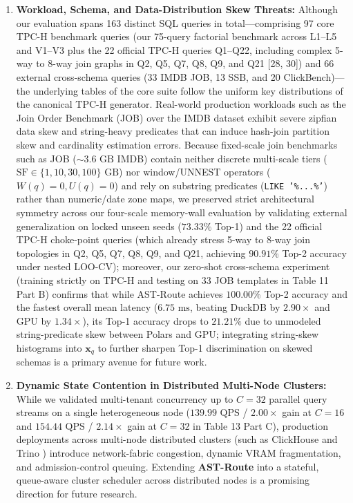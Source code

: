 \documentclass[10pt,a4paper]{article}
\begin{document}
\begin{enumerate}[leftmargin=1.5em,itemsep=2pt]
    \item \textbf{Workload, Schema, and Data-Distribution Skew Threats:} Although our evaluation spans 163 distinct SQL queries in total---comprising 97 core TPC-H benchmark queries (our 75-query factorial benchmark across L1--L5 and V1--V3 plus the 22 official TPC-H queries Q1--Q22, including complex 5-way to 8-way join graphs in Q2, Q5, Q7, Q8, Q9, and Q21 [28, 30]) and 66 external cross-schema queries (33 IMDB JOB, 13 SSB, and 20 ClickBench)---the underlying tables of the core suite follow the uniform key distributions of the canonical TPC-H generator. Real-world production workloads such as the Join Order Benchmark (JOB) \cite{leis2015job} over the IMDB dataset exhibit severe zipfian data skew and string-heavy predicates that can induce hash-join partition skew and cardinality estimation errors. Because fixed-scale join benchmarks such as JOB ($\sim 3.6\text{ GB}$ IMDB) contain neither discrete multi-scale tiers ($\text{SF} \in \{1, 10, 30, 100\}\text{ GB}$) nor window/UNNEST operators ($W(q)=0, U(q)=0$) and rely on substring predicates (\texttt{LIKE '\%...\%'}) rather than numeric/date zone maps, we preserved strict architectural symmetry across our four-scale memory-wall evaluation by validating external generalization on locked unseen seeds ($73.33\%$ Top-1) and the 22 official TPC-H choke-point queries (which already stress 5-way to 8-way join topologies in Q2, Q5, Q7, Q8, Q9, and Q21, achieving $90.91\%$ Top-2 accuracy under nested LOO-CV); moreover, our zero-shot cross-schema experiment (training strictly on TPC-H and testing on 33 JOB templates in Table 11 Part B) confirms that while AST-Route achieves $100.00\%$ Top-2 accuracy and the fastest overall mean latency ($6.75\text{ ms}$, beating DuckDB by $2.90\times$ and GPU by $1.34\times$), its Top-1 accuracy drops to $21.21\%$ due to unmodeled string-predicate skew between Polars and GPU; integrating string-skew histograms into $\mathbf{x}_q$ to further sharpen Top-1 discrimination on skewed schemas is a primary avenue for future work.
    \item \textbf{Dynamic State Contention in Distributed Multi-Node Clusters:} While we validated multi-tenant concurrency up to $C=32$ parallel query streams on a single heterogeneous node ($139.99\text{ QPS}$ / $2.00\times$ gain at $C=16$ and $154.44\text{ QPS}$ / $2.14\times$ gain at $C=32$ in Table 13 Part C), production deployments across multi-node distributed clusters (such as ClickHouse \cite{schulze2024clickhouse} and Trino \cite{sethi2019presto}) introduce network-fabric congestion, dynamic VRAM fragmentation, and admission-control queuing. Extending \textbf{AST-Route} into a stateful, queue-aware cluster scheduler across distributed nodes is a promising direction for future research.
\end{enumerate}
\end{document}
